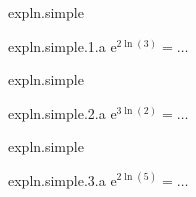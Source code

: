 \begin{qcm}{expln.simple}
    \begin{question}{expln.simple.1.a}
         \(\mathrm{e}^{2\ln(3)}=\ldots\)
         \vspace{-1.5ex}
         \begin{multicols}{3}
         \begin{reponses}
         \end{reponses}
         \end{multicols}
    \end{question}
\end{qcm}

\begin{qcm}{expln.simple}
    \begin{question}{expln.simple.2.a}
         \(\mathrm{e}^{3\ln(2)}=\ldots\)
         \vspace{-1.5ex}
         \begin{multicols}{3}
         \begin{reponses}
         \end{reponses}
         \end{multicols}
    \end{question}
\end{qcm}

\begin{qcm}{expln.simple}
    \begin{question}{expln.simple.3.a}
         \(\mathrm{e}^{2\ln(5)}=\ldots\)
         \vspace{-1.5ex}
         \begin{multicols}{3}
         \begin{reponses}
         \end{reponses}
         \end{multicols}
    \end{question}
\end{qcm}

